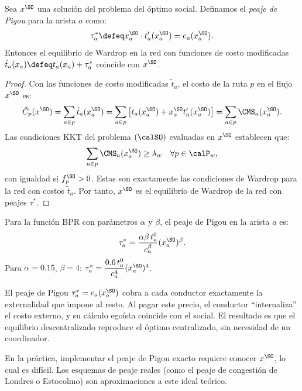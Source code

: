 \begin{theorem}\label{thm:pigou_toll}
Sea $x^{\SO}$ una solución del problema del óptimo social. Definamos el \emph{peaje de Pigou} para la arista $a$ como:
\[
\tau_a^* \defeq x_a^{\SO} \cdot t_a'(x_a^{\SO}) = e_a(x_a^{\SO}).
\]
Entonces el equilibrio de Wardrop en la red con funciones de costo modificadas $\tilde{t}_a(x_a) \defeq t_a(x_a) + \tau_a^*$ coincide con $x^{\SO}$.
\end{theorem}

\begin{proof}
Con las funciones de costo modificadas $\tilde{t}_a$, el costo de la ruta $p$ en el flujo $x^{\SO}$ es:
\[
\tilde{C}_p(x^{\SO}) = \sum_{a \in p} \tilde{t}_a(x_a^{\SO}) = \sum_{a \in p} \left[ t_a(x_a^{\SO}) + x_a^{\SO} t_a'(x_a^{\SO}) \right] = \sum_{a \in p} \CMS_a(x_a^{\SO}).
\]
Las condiciones KKT del problema $(\calSO)$ evaluadas en $x^{\SO}$ establecen que:
\[
\sum_{a \in p} \CMS_a(x_a^{\SO}) \geq \lambda_w \quad \forall p \in \calP_w,
\]
con igualdad si $f_p^{\SO} > 0$. Estas son exactamente las condiciones de Wardrop para la red con costos $\tilde{t}_a$. Por tanto, $x^{\SO}$ es el equilibrio de Wardrop de la red con peajes $\tau^*$.
\end{proof}

\begin{corollary}
Para la función BPR con parámetros $\alpha$ y $\beta$, el peaje de Pigou en la arista $a$ es:
\[
\tau_a^* = \frac{\alpha \beta \, t_a^0}{c_a^\beta} (x_a^{\SO})^\beta.
\]
Para $\alpha = 0.15$, $\beta = 4$: $\tau_a^* = \dfrac{0.6 \, t_a^0}{c_a^4} (x_a^{\SO})^4$.
\end{corollary}

\begin{remark}
El peaje de Pigou $\tau_a^* = e_a(x_a^{\SO})$ cobra a cada conductor exactamente la externalidad que impone al resto. Al pagar este precio, el conductor ``internaliza'' el costo externo, y su cálculo egoísta coincide con el social. El resultado es que el equilibrio descentralizado reproduce el óptimo centralizado, sin necesidad de un coordinador.

En la práctica, implementar el peaje de Pigou exacto requiere conocer $x^{\SO}$, lo cual es difícil. Los esquemas de peaje reales (como el peaje de congestión de Londres o Estocolmo) son aproximaciones a este ideal teórico.
\end{remark}
